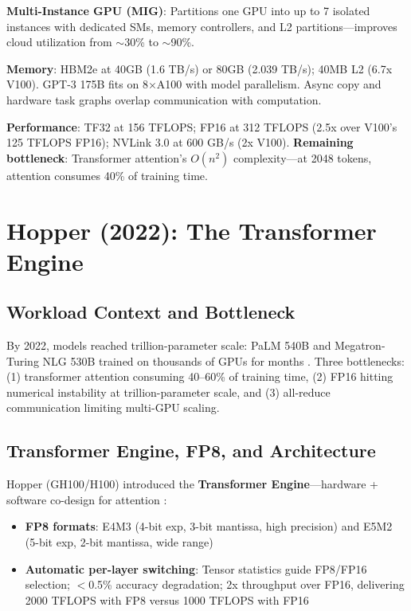 \documentclass{article}
\begin{document}
\textbf{Multi-Instance GPU (MIG)}: Partitions one GPU into up to 7 isolated instances with dedicated SMs, memory controllers, and L2 partitions---improves cloud utilization from $\sim$30\% to $\sim$90\%.

\textbf{Memory}: HBM2e at 40GB (1.6 TB/s) or 80GB (2.039 TB/s); 40MB L2 (6.7x V100). GPT-3 175B fits on 8$\times$A100 with model parallelism. Async copy and hardware task graphs overlap communication with computation.

\textbf{Performance}: TF32 at 156 TFLOPS; FP16 at 312 TFLOPS (2.5x over V100's 125 TFLOPS FP16); NVLink 3.0 at 600 GB/s (2x V100). \textbf{Remaining bottleneck}: Transformer attention's $O(n^2)$ complexity---at 2048 tokens, attention consumes 40\% of training time.

\section{Hopper (2022): The Transformer Engine}

\subsection{Workload Context and Bottleneck}

By 2022, models reached trillion-parameter scale: PaLM 540B and Megatron-Turing NLG 530B trained on thousands of GPUs for months \cite{chowdhery2022palm}. Three bottlenecks: (1) transformer attention consuming 40--60\% of training time, (2) FP16 hitting numerical instability at trillion-parameter scale, and (3) all-reduce communication limiting multi-GPU scaling.

\subsection{Transformer Engine, FP8, and Architecture}

Hopper (GH100/H100) introduced the \textbf{Transformer Engine}---hardware + software co-design for attention \cite{nvidia2022hopper}:
\begin{itemize}
\item \textbf{FP8 formats}: E4M3 (4-bit exp, 3-bit mantissa, high precision) and E5M2 (5-bit exp, 2-bit mantissa, wide range)
\item \textbf{Automatic per-layer switching}: Tensor statistics guide FP8/FP16 selection; $<$0.5\% accuracy degradation; 2x throughput over FP16, delivering 2000 TFLOPS with FP8 versus 1000 TFLOPS with FP16
\end{itemize}
\end{document}
